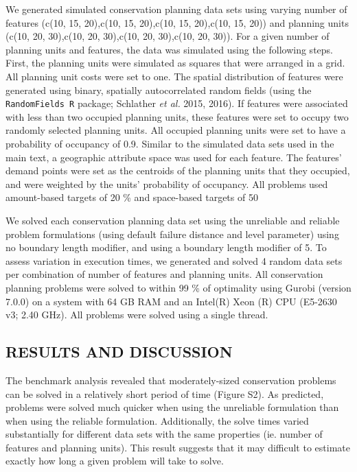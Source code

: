 \documentclass[11pt,]{article}
\begin{document}
We generated simulated conservation planning data sets using varying
number of features (c(10, 15, 20),c(10, 15, 20),c(10, 15, 20),c(10, 15,
20)) and planning units (c(10, 20, 30),c(10, 20, 30),c(10, 20, 30),c(10,
20, 30)). For a given number of planning units and features, the data
was simulated using the following steps. First, the planning units were
simulated as squares that were arranged in a grid. All planning unit
costs were set to one. The spatial distribution of features were
generated using binary, spatially autocorrelated random fields (using
the \texttt{RandomFields R} package; Schlather \emph{et al.} 2015,
2016). If features were associated with less than two occupied planning
units, these features were set to occupy two randomly selected planning
units. All occupied planning units were set to have a probability of
occupancy of 0.9. Similar to the simulated data sets used in the main
text, a geographic attribute space was used for each feature. The
features' demand points were set as the centroids of the planning units
that they occupied, and were weighted by the units' probability of
occupancy. All problems used amount-based targets of 20 \% and
space-based targets of 50

We solved each conservation planning data set using the unreliable and
reliable problem formulations (using default failure distance and level
parameter) using no boundary length modifier, and using a boundary
length modifier of 5. To assess variation in execution times, we
generated and solved 4 random data sets per combination of number of
features and planning units. All conservation planning problems were
solved to within 99 \% of optimality using Gurobi (version 7.0.0) on a
system with 64 GB RAM and an Intel(R) Xeon (R) CPU (E5-2630 v3; 2.40
GHz). All problems were solved using a single thread.

\subsection{RESULTS AND DISCUSSION}\label{results-and-discussion}

The benchmark analysis revealed that moderately-sized conservation
problems can be solved in a relatively short period of time (Figure S2).
As predicted, problems were solved much quicker when using the
unreliable formulation than when using the reliable formulation.
Additionally, the solve times varied substantially for different data
sets with the same properties (ie. number of features and planning
units). This result suggests that it may difficult to estimate exactly
how long a given problem will take to solve.
\end{document}
